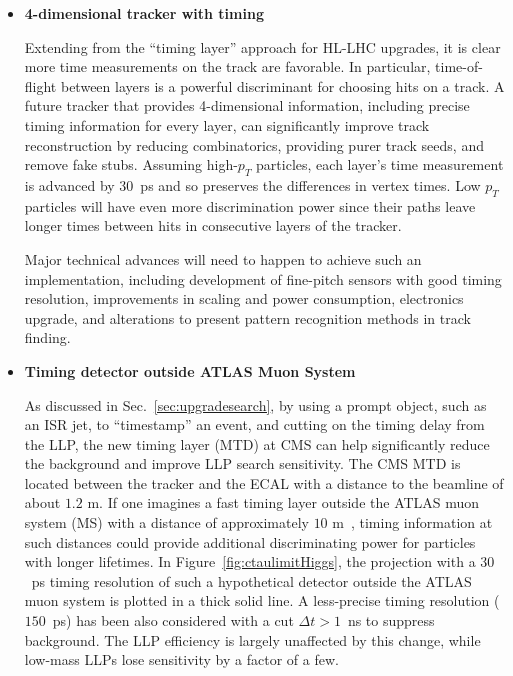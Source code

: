 \begin{itemize}
\item \textbf{4-dimensional tracker with timing}

Extending from the ``timing layer'' approach for HL-LHC upgrades, it is clear more time measurements on the track are favorable. In particular, time-of-flight between layers is a powerful discriminant for choosing hits on a track. A future tracker that provides 4-dimensional information, including precise timing information for every layer, can significantly improve track reconstruction by reducing combinatorics, providing purer track seeds, and remove fake stubs. Assuming high-$p_T$ particles, each layer's time measurement is advanced by 30~ps and so preserves the differences in vertex times. Low $p_T$ particles will have even more discrimination power since their paths leave longer times between hits in consecutive layers of the tracker.

Major technical advances will need to happen to achieve such an implementation, including development of fine-pitch sensors with good timing resolution, improvements in scaling and power consumption, electronics upgrade, and alterations to present pattern recognition methods in track finding.

\item \textbf{Timing detector outside ATLAS Muon System}

As discussed in Sec.~\ref{sec:upgradesearch}, by using a prompt object, such as an ISR jet, to ``timestamp'' an event, and cutting on the timing delay from the LLP, the new timing layer (MTD) at CMS can help significantly reduce the background and improve LLP search sensitivity. The CMS MTD is located between the tracker and the ECAL with a distance to the beamline of about $1.2\,\,\mathrm{m}$. If one imagines a fast timing layer outside the ATLAS muon system (MS) with a distance of approximately $10\,\,\mathrm{m}$~\cite{Liu:2018wte}, timing information at such distances could provide additional discriminating power for particles with longer lifetimes. In Figure~\ref{fig:ctaulimitHiggs}, the projection with a $30$~ps timing resolution of such a hypothetical detector outside the ATLAS muon system is plotted in a thick solid line. A less-precise timing resolution ($150$~ps) has been also considered with a cut $\Delta t > 1$~ns to suppress background. The LLP efficiency is largely unaffected by this change, while low-mass LLPs lose sensitivity by a factor of a few.


\end{itemize}
